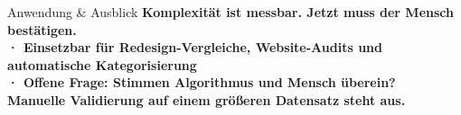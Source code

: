 \documentclass[final]{beamer}
\newlength{\sepwidth}\setlength{\sepwidth}{0.025\textwidth}
\newlength{\boxwidth}\setlength{\boxwidth}{0.305\textwidth}
\begin{document}
\begin{frame}[t]{}
\begin{columns}[T]
\hspace{\sepwidth}

\begin{column}{\boxwidth}
\end{column}

\end{columns}

\vspace{0.8em}

\begin{alertblock}{Anwendung \& Ausblick}
  \vspace{0.3em}
  \LARGE\bfseries
  Komplexität ist messbar. Jetzt muss der Mensch bestätigen.\\[0.5em]
  \large\mdseries
  · Einsetzbar für Redesign-Vergleiche, Website-Audits und automatische Kategorisierung\\[0.3em]
  · Offene Frage: Stimmen Algorithmus und Mensch überein?\\[0.3em]
  {\color{muted!60!white}\normalsize Manuelle Validierung auf einem größeren Datensatz steht aus.}
  \vspace{0.3em}
\end{alertblock}

\end{frame}
\end{document}
